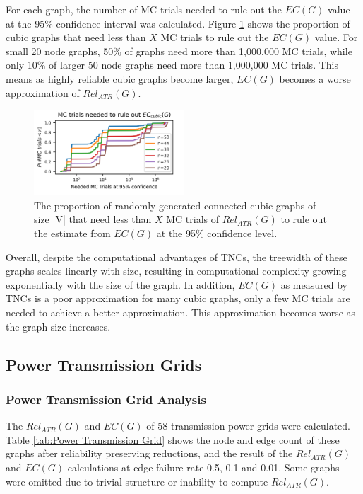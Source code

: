 For each graph, the number of MC trials needed to rule out the \(EC(G)\) value at the 95\% confidence interval was calculated. Figure \ref{fig:Random Cubic MC} shows the proportion of cubic graphs that need less than \(X\) MC trials to rule out the \(EC(G)\) value. For small 20 node graphs, 50\% of graphs need more than 1,000,000 MC trials, while only 10\% of larger 50 node graphs need more than 1,000,000 MC trials. This means as highly reliable cubic graphs become larger, \(EC(G)\) becomes a worse approximation of \(Rel_{ATR}(G)\).

\begin{figure}[t]
\caption{The proportion of randomly generated connected cubic graphs of size |V| that need less than $X$ MC trials of $Rel_{ATR}(G)$ to rule out the estimate from $EC(G)$ at the 95\% confidence level.}
\label{fig:Random Cubic MC}
\includegraphics[width=0.5\textwidth]{../figures/RcubicTrials.png}
\end{figure}

Overall, despite the computational advantages of TNCs, the treewidth of these graphs scales linearly with size, resulting in computational complexity growing exponentially with the size of the graph. In addition, \(EC(G)\) as measured by TNCs is a poor approximation for many cubic graphs, only a few MC trials are needed to achieve a better approximation. This approximation becomes worse as the graph size increases.

\hypertarget{power-transmission-grids}{%
\subsection{Power Transmission Grids}\label{power-transmission-grids}}

\hypertarget{power-transmission-grid-analysis}{%
\subsubsection{Power Transmission Grid Analysis}\label{power-transmission-grid-analysis}}

The \(Rel_{ATR}(G)\) and \(EC(G)\) of 58 transmission power grids \cite{li2016characterizing} were calculated. Table \ref{tab:Power Transmission Grid} shows the node and edge count of these graphs after reliability preserving reductions, and the result of the \(Rel_{ATR}(G)\) and \(EC(G)\) calculations at edge failure rate 0.5, 0.1 and 0.01. Some graphs were omitted due to trivial structure or inability to compute \(Rel_{ATR}(G)\).

